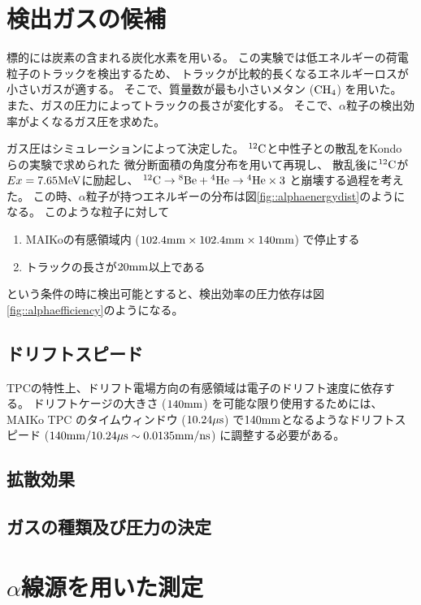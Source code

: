 \section{検出ガスの候補}
標的には炭素の含まれる炭化水素を用いる。
この実験では低エネルギーの荷電粒子のトラックを検出するため、
トラックが比較的長くなるエネルギーロスが小さいガスが適する。
そこで、質量数が最も小さいメタン ($\rm{CH}_{4}$) を用いた。
また、ガスの圧力によってトラックの長さが変化する。
そこで、$\alpha$粒子の検出効率がよくなるガス圧を求めた。

ガス圧はシミュレーションによって決定した。
${}^{12}\rm{C}$と中性子との散乱をKondo らの実験で求められた
微分断面積の角度分布を用いて再現し、
散乱後に${}^{12}\rm{C}$が$Ex = 7.65\rm{MeV}$に励起し、
${}^{12}\rm{C}\rightarrow{}^{8}\rm{Be}+{}^{4}\rm{He}\rightarrow{}^{4}\rm{He}\times 3$
と崩壊する過程を考えた。
この時、$\alpha$粒子が持つエネルギーの分布は図\ref{fig::alphaenergydist}のようになる。
このような粒子に対して
\begin{enumerate}
\item
  MAIKoの有感領域内 ($102.4\rm{mm}\times 102.4\rm{mm}\times 140\rm{mm}$) で停止する
\item
  トラックの長さが$20\rm{mm}$以上である
\end{enumerate}
という条件の時に検出可能とすると、検出効率の圧力依存は図\ref{fig::alphaefficiency}のようになる。

\subsection{ドリフトスピード}
TPCの特性上、ドリフト電場方向の有感領域は電子のドリフト速度に依存する。
ドリフトケージの大きさ ($140\rm{mm}$) を可能な限り使用するためには、
MAIKo TPC のタイムウィンドウ ($10.24\rm{\mu s}$) で$140\rm{mm}$となるようなドリフトスピード
($140\rm{mm}/10.24\rm{\mu s} \sim 0.0135\rm{mm/ns}$) に調整する必要がある。

\subsection{拡散効果}

\subsection{ガスの種類及び圧力の決定}

\section{$\alpha$線源を用いた測定}
